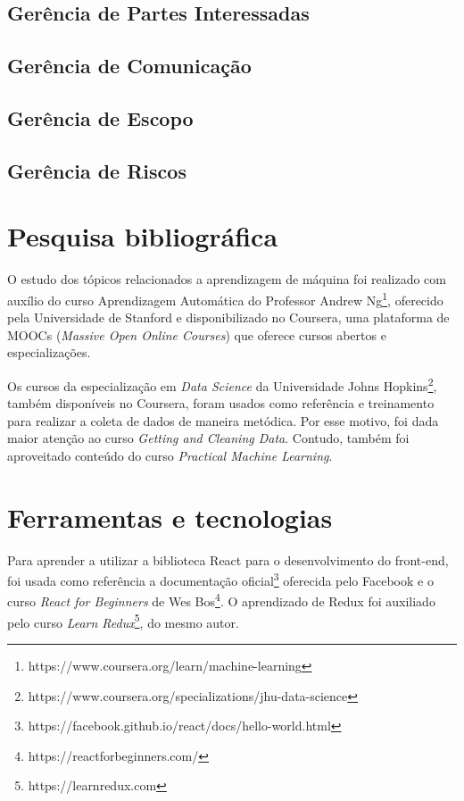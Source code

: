 \subsection{Gerência de Partes Interessadas}
\subsection{Gerência de Comunicação}
\subsection{Gerência de Escopo}
\subsection{Gerência de Riscos}

\section{Pesquisa bibliográfica}
O estudo dos tópicos relacionados a aprendizagem de máquina foi realizado com auxílio do curso Aprendizagem Automática do Professor Andrew Ng\footnote{ https://www.coursera.org/learn/machine-learning}, oferecido pela Universidade de Stanford e disponibilizado no Coursera, uma plataforma de MOOCs (\textit{Massive Open Online Courses}) que oferece cursos abertos e especializações.

Os cursos da especialização em \textit{Data Science} da Universidade Johns Hopkins\footnote{ https://www.coursera.org/specializations/jhu-data-science}, também disponíveis no Coursera, foram usados como referência e treinamento para realizar a coleta de dados de maneira metódica. Por esse motivo, foi dada maior atenção ao curso \textit{Getting and Cleaning Data}. Contudo, também foi aproveitado conteúdo do curso \textit{Practical Machine Learning}.

\section{Ferramentas e tecnologias}
Para aprender a utilizar a biblioteca React para o desenvolvimento do front-end, foi usada como referência a documentação oficial\footnote{https://facebook.github.io/react/docs/hello-world.html} oferecida pelo Facebook e o curso \textit{React for Beginners} de Wes Bos\footnote{ https://reactforbeginners.com/}. O aprendizado de Redux foi auxiliado pelo curso \textit{Learn Redux}\footnote{https://learnredux.com}, do mesmo autor.
